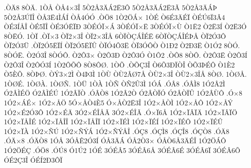 {.^^d2^^c48
8^^d2^^c4.
1^^d2^^c5
^^d2^^c54^^d73^^ce
5^^d22^^c53^^c4^^c12^^cb3^^d4
5^^d22^^c53^^c4^^c12^^cb3^^c3
5^^d22^^c53^^c4^^c1^^de
5^^d22^^c53^^da^^cf^^ce
^^d2^^c53^^cb4^^cc^^c1^^cd
^^d2^^c54^^d3^^d3
.^^d2^^d68
1^^d22^^d6^^c1^^d7
1^^d2^^c9
^^d26^^c93^^c4^^c9^^cf
^^d2^^c9^^da6^^cf3^^c24
^^d2^^c93^^cd^^c5^^ce
^^d2^^c95^^cf^^ce
^^d2^^c93^^d3^^cb^^cf^^d0
3^^d2^^c9^^d3^^cf^^d7^^c1
3^^d2^^c9^^d3^^cf^^d7^^cb
3^^d2^^c9^^d3^^cf^^d7^^d9
^^d21^^cb2
^^d22^^cb3^^cd
^^d22^^cb3^^d3
8^^d2^^cb^^d3.
1^^d2^^cf
.^^d2^^cf^^d73
^^d2^^cf2^^d73^^ce
^^d2^^cf2^^d73^^ce^^c5
6^^d2^^cf^^d2^^c7^^c1^^ce^^c9^^cb
6^^d2^^cf^^d2^^c7^^c1^^ce^^c9^^de^^c5
^^d2^^cf2^^d33^^d4
^^d2^^cf2^^d33^^dc
.^^d2^^cf2^^d35^^cb^^cf^^cd
^^d2^^cf2^^d35^^cb^^cf^^db
^^d2^^cf^^d34^^d43^^cb
^^d2^^cf3^^d3^^d4^^d2
^^d21^^d02
^^d22^^d03^^cb
^^d21^^d32
8^^d2^^d3.
8^^d2^^d3^^cb.
^^d22^^d33^^ce
8^^d2^^d3^^d4.
^^d22^^d43^^d7
^^d22^^d43^^d0
^^d22^^d43^^d3
^^d21^^d42
.^^d2^^d48
8^^d2^^d4.
^^d22^^d43^^cb
^^d22^^d43^^cd
^^d22^^d43^^ce
^^d22^^d4^^d33^^cd
1^^d22^^d4^^d5^^d4
8^^d28^^d4^^d8.
1^^d2^^d5
.^^d2^^d5^^c73^^ce
^^d26^^d53^^d0^^cf^^d2^^ce
^^d2^^d53^^de^^c9^^d4
^^d21^^c82
^^d25^^c8^^d5.
8^^d2^^de^^d8.
^^d2^^dd3^^d72^^cc
^^d24^^de3^^cc
1^^d2^^d9
^^d2^^d92^^c2^^d87^^c5
^^d2^^d92^^d73^^ce
^^d2^^d92^^d73^^ce^^c5
8^^d2^^d8.
1^^d2^^d8^^c5.
1^^d2^^d8^^c9.
1^^d2^^d8^^c0.
1^^d2^^d8^^d1.
1^^d2^^dc
1^^d2^^c0
1^^d2^^d1
^^d2^^d12^^db3^^cc
1^^d3^^c1
.^^d3^^c28
.^^d3^^c2^^cc8
1^^d32^^c22^^cc
^^d32^^c2^^cc^^c9^^d6
^^d32^^c2^^cc^^c9^^da
1^^d32^^c2^^cf^^d2
.^^d3^^c2^^d28
1^^d32^^c22^^d2
^^d32^^c2^^d2^^cf^^d3
^^d32^^c2^^d2^^cf^^db
1^^d32^^c2^^d9^^d4
.^^d3^^d78
1^^d32^^d7^^c1^^c9^^d7
1^^d32^^d7^^c5^^d6
5^^d3^^d7^^c5^^d24^^c85
^^d3^^d7^^c5^^d22^^cb3^^ce
1^^d32^^d7^^c5^^d2^^cc
1^^d32^^d7^^c5^^d4
1^^d32^^d7^^c5^^dd
1^^d32^^d7^^c92^^d33^^d4
1^^d32^^d7^^c9^^c4
3^^d32^^d7^^c9^^ce^^c5^^c3
3^^d32^^d7^^c9^^ce^^c3
.^^d3^^d7^^cf6^^c5
1^^d32^^d7^^cf^^c2^^cf^^c4
1^^d32^^d7^^cf^^c2^^cf^^d6
1^^d32^^d7^^cf^^c5^^ce^^c9
1^^d32^^d7^^cf^^c5^^ce^^ce
1^^d32^^d7^^cf^^c5^^ce^^cf
1^^d32^^d7^^cf^^c9^^cc
1^^d32^^d7^^cf^^c9^^cd
1^^d32^^d7^^cf^^c9^^d4
1^^d32^^d7^^cf^^c9^^db
1^^d32^^d7^^cf^^c0
1^^d32^^d7^^d1^^da
1^^d32^^d7^^d1^^dd^^c1
1^^d32^^d7^^d1^^dd^^c5^^ce
.^^d3^^c78
.^^d3^^c7^^cc8
.^^d3^^c7^^ce8
.^^d3^^c7^^d28
.^^d3^^c48
.^^d3^^c4^^d78
.^^d3^^c4^^d28
1^^d3^^c5
3^^d3^^c5^^ca2^^d33^^cd
^^d3^^c53^^c4^^c1
^^d3^^c52^^d23^^d7
^^d3^^c5^^d26^^c53^^c4^^c9^^ce
1^^d32^^d6^^c1^^d4
1^^d32^^d6^^c9^^c7
.^^d3^^d68
.^^d3^^da8
^^d31^^da2
1^^d3^^c9
3^^d3^^c9^^c25
3^^d3^^c9^^c26^^c5
3^^d3^^c9^^c26^^c9
3^^d3^^c9^^c26^^cf
3^^d3^^c9^^c26^^d5
^^d3^^c92^^c73^^ce
^^d3^^c9^^cd2^^d03^^d4^^cf
}
